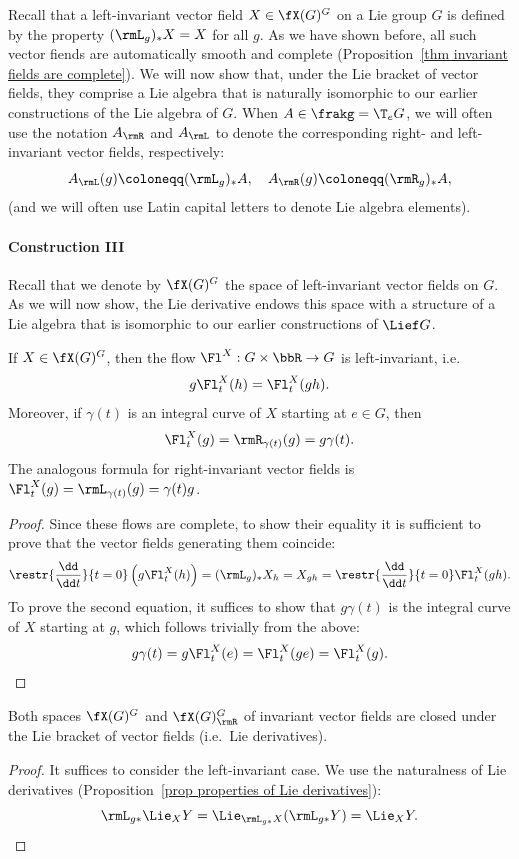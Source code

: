 Recall that a left-invariant vector field $X\in\fX(G)^G$ on a Lie group $G$ is defined by the property $(\rmL_g)_\ast X=X$ for all $g$. As we have shown before, all such vector fiends are automatically smooth and complete (Proposition~\ref{thm invariant fields are complete}). We will now show that, under the Lie bracket of vector fields, they comprise a Lie algebra that is naturally isomorphic to our earlier constructions of the Lie algebra of $G$. When $A\in\frakg=\T_eG$, we will often use the notation $A_\rmR$ and $A_\rmL$ to denote the corresponding right- and left-invariant vector fields, respectively:
\[A_\rmL(g)\coloneqq (\rmL_g)_\ast A,\quad A_\rmR(g)\coloneqq (\rmR_g)_\ast A,\]
(and we will often use Latin capital letters to denote Lie algebra elements).

\paragraph{Construction III} Recall that we denote by $\fX(G)^G$ the space of left-invariant vector fields on $G$. As we will now show, the Lie derivative endows this space with a structure of a Lie algebra that is isomorphic to our earlier constructions of $\Lief G$.

\begin{lem}\label{lem 471841}
    If $X\in\fX(G)^G$, then the flow $\Fl^X:G\times \bbR \to G$ is left-invariant, i.e.
    \[g\Fl^X_t(h)=\Fl^X_t(gh).\]
    Moreover, if $\gamma(t)$ is an integral curve of $X$ starting at $e\in G$, then
    \[\Fl^X_t(g)=\rmR_{\gamma(t)}(g)=g\gamma(t).\]
    The analogous formula for right-invariant vector fields is $\Fl^X_t(g)=\rmL_{\gamma(t)}(g)=\gamma(t)g$.
\end{lem}
\begin{proof}
    Since these flows are complete, to show their equality it is sufficient to prove that the vector fields generating them coincide:
    \[\restr{\frac{\dd}{\dd t}}{t=0}\left(g\Fl^X_t(h)\right)=(\rmL_g)_{\ast}X_{h}=X_{gh}=\restr{\frac{\dd}{\dd t}}{t=0} \Fl^X_t(gh).\]
    To prove the second equation, it suffices to show that $g\gamma(t)$ is the integral curve of $X$ starting at $g$, which follows trivially from the above:
    \[g\gamma(t)=g \Fl^X_t(e)=\Fl^X_t(ge)=\Fl^X_t(g).\]
\end{proof}


\begin{lem}
    Both spaces $\fX(G)^G$ and $\fX(G)^G_\rmR$ of invariant vector fields are closed under the Lie bracket of vector fields (i.e.~Lie derivatives).
\end{lem}
\begin{proof}
    It suffices to consider the left-invariant case. We use the naturalness of Lie derivatives (Proposition~\ref{prop properties of Lie derivatives}):
    \[\rmL_{g\ast} \Lie_X Y=\Lie_{\rmL_{g\ast}X}(\rmL_{g\ast} Y)=\Lie_X Y.\]
\end{proof}


